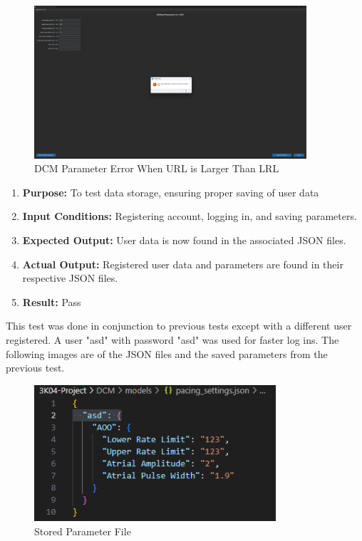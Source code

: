 \documentclass{article}
\newcounter{subsubsubsection}[subsubsection]
\begin{document}
\begin{tcolorbox}
    \begin{figure}[H]\label{urlirl}
        \centering
        \includegraphics[width=0.9\textwidth]{urlirl.png}
        \caption{DCM Parameter Error When URL is Larger Than LRL}
    \end{figure}
\end{tcolorbox}

\newpage
{}
\begin{enumerate}[label=]
   \item \textbf{Purpose:} To test data storage, ensuring proper saving of user data
   \item \textbf{Input Conditions:} Registering account, logging in, and saving parameters.
   \item \textbf{Expected Output:} User data is now found in the associated JSON files.
   \item \textbf{Actual Output:}  Registered user data and parameters are found in their respective JSON files.
   \item \textbf{Result:} Pass
\end{enumerate}

This test was done in conjunction to previous tests except with a different user registered. A user "asd" 
with password "asd" was used for faster log ins. The following images are of the JSON files and the saved parameters 
from the previous test. 

\begin{tcolorbox}
    \begin{figure}[H]\label{savedparams}
        \centering
        \includegraphics[width=0.8\textwidth]{savedparams.png}
        \caption{Stored Parameter File}
    \end{figure}
\end{tcolorbox}
\end{document}
